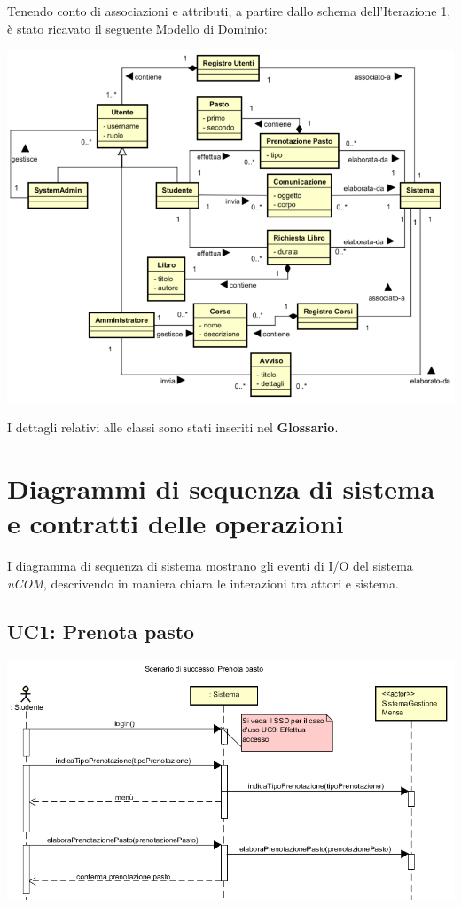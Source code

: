 \documentclass[12pt]{report}
\begin{document}
	Tenendo conto di associazioni e attributi, a partire dallo schema dell'Iterazione 1, è stato ricavato il seguente Modello di Dominio:
	
	\begin{center}	
	\includegraphics[scale=0.75]{./images/domain-I3.png}
	\end{center}
	
	I dettagli relativi alle classi sono stati inseriti nel \textbf{Glossario}.
	
	\newpage
	
	\section{Diagrammi di sequenza di sistema e contratti delle operazioni}
	
	I diagramma di sequenza di sistema mostrano gli eventi di I/O del sistema \textit{uCOM}, descrivendo in maniera chiara le interazioni tra attori e sistema.
	
	\subsection{UC1: Prenota pasto}
	\begin{center}
		\includegraphics{./images/SSD_UC1.png}
	\end{center}
	
\end{document}
